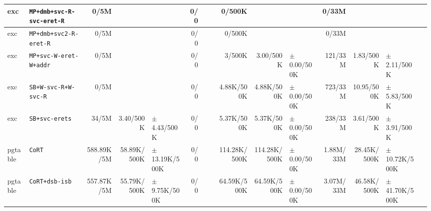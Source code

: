 \begin{tabular}{l l  | r r l | r r l | r r l | r r l l}
             exc &                             \verb|MP+dmb+svc-R-svc-eret-R| &           0/5M &                       &                   &            0/0 &                       &                 &         0/500K &                       &                   &          0/33M &                       &                   & \\ \hline 
             exc &                                \verb|MP+dmb+svc2-R-eret-R| &           0/5M &                       &                   &            0/0 &                       &                 &         0/500K &                       &                   &          0/33M &                       &                   & \\ \hline 
             exc &                                \verb|MP+svc-W-eret-W+addr| &           0/5M &                       &                   &            0/0 &                       &                 &         3/500K &             3.00/500K &   $\pm$ 0.00/500K &        121/33M &             1.83/500K &   $\pm$ 2.11/500K & \\ \hline 
             exc &                                  \verb|SB+W-svc-R+W-svc-R| &           0/5M &                       &                   &            0/0 &                       &                 &     4.88K/500K &            4.88K/500K &   $\pm$ 0.00/500K &        723/33M &            10.95/500K &   $\pm$ 5.83/500K & \\ \hline 
             exc &                                        \verb|SB+svc-erets| &          34/5M &             3.40/500K &   $\pm$ 4.43/500K &            0/0 &                       &                 &     5.37K/500K &            5.37K/500K &   $\pm$ 0.00/500K &        238/33M &             3.61/500K &   $\pm$ 3.91/500K & \\ \hline 
         pgtable &                                                \verb|CoRT| &     588.89K/5M &           58.89K/500K & $\pm$ 13.19K/500K &            0/0 &                       &                 &   114.28K/500K &          114.28K/500K &   $\pm$ 0.00/500K &      1.88M/33M &           28.45K/500K & $\pm$ 10.72K/500K & \\ \hline 
         pgtable &                                        \verb|CoRT+dsb-isb| &     557.87K/5M &           55.79K/500K &  $\pm$ 9.75K/500K &            0/0 &                       &                 &    64.59K/500K &           64.59K/500K &   $\pm$ 0.00/500K &      3.07M/33M &           46.58K/500K & $\pm$ 41.70K/500K & \\ \hline 

\end{tabular}
